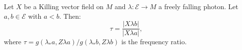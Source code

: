 Let $X$ be a Killing vector field on $M$ and $\lambda: \mathcal{E} \to M$ a freely falling photon. Let $a, b \in \mathcal{E}$ with $a < b$. Then:
$$\tau = \frac{|X\lambda b|}{|X\lambda a|},$$
where $\tau = g(\lambda_*a, Z\lambda a)/g(\lambda_*b, Z\lambda b)$ is the frequency ratio.
